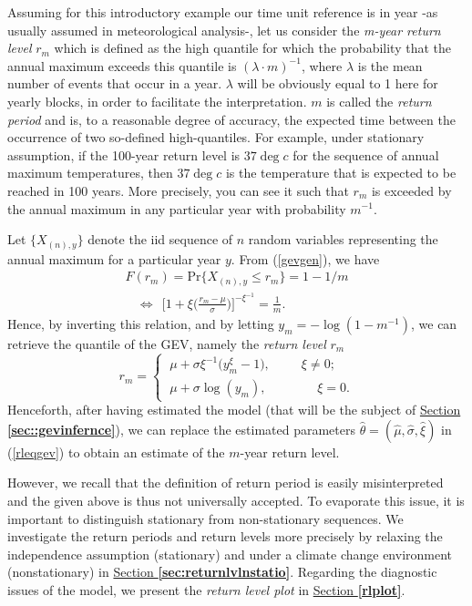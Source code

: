 Assuming for this introductory example our time unit reference is in year -as usually assumed in meteorological analysis-, let us consider the \emph{m-year return level} $r_m$ which is defined as the high quantile for which the probability that the annual maximum exceeds this quantile is $(\lambda\cdot m)^{-1}$, where $\lambda$ is the mean number of events that occur in a year. $\lambda$ will be obviously equal to 1 here for yearly blocks, in order to facilitate the interpretation. $m$ is called the \emph{return period} and is, to a reasonable degree of accuracy, the expected time between the occurrence of two so-defined high-quantiles. For example, under stationary assumption, if the 100-year return level is $37\deg c$ for the sequence of annual maximum temperatures, then $37\deg c$ is the temperature that is expected to be reached in 100 years. More precisely, you can see it such that $r_m$ is exceeded by the annual maximum in any particular year with probability $m^{-1}$.

Let $\{X_{(n),y}\}$ denote the iid sequence of $n$ random variables representing the annual maximum for a particular year $y$. From (\ref{gevgen}), we have
\begin{align*}
F(r_m)=\text{Pr}\{X_{(n),y}\leq r_m\}=1-1/m 
\\ \ \ \ \ \Leftrightarrow \ \ \Bigg[1+\xi\bigg(\frac{r_m-\mu}{\sigma}\bigg)\Bigg]^{-\xi^{-1}}=\frac{1}{m}.
\end{align*}
Hence, by inverting this relation, and by letting $y_m=-\log(1-m^{-1})$, we can retrieve the quantile of the GEV, namely the \emph{return level} $r_m$
\begin{equation}\label{rleqgev}
r_m=\begin{cases}
\ \mu+\sigma\xi^{-1}\big(y_m^{\xi}-1\big), \ \ \ \ \ \ \ \  \ \ \  \xi\neq 0;\\
\ \mu +\sigma \log(y_m), \ \ \ \ \ \ \ \ \ \  \ \ \ \ \ \ \ \ \xi =0.
\end{cases}
\end{equation}
Henceforth, after having estimated the model (that will be the subject of \hyperref[sec::gevinfernce]{Section \textbf{\ref{sec::gevinfernce}}}), we can replace the estimated parameters $\hat{\theta}=(\hat{\mu},\hat{\sigma},\hat{\xi})$ in (\ref{rleqgev}) to obtain an estimate of the $m$-year return level.

However, we recall that the definition of return period is easily misinterpreted and the given above is thus not universally accepted. %
To evaporate this issue, it is important to distinguish stationary from non-stationary sequences.
We investigate the return periods and return levels
more precisely by relaxing the independence assumption (stationary) and under a climate change environment (nonstationary) in \hyperref[sec:returnlvlnstatio]{Section \textbf{\ref{sec:returnlvlnstatio}}}.
Regarding the diagnostic issues of the model, we present the \emph{return level plot} in \hyperref[rlplot]{Section \textbf{\ref{rlplot}}}.


